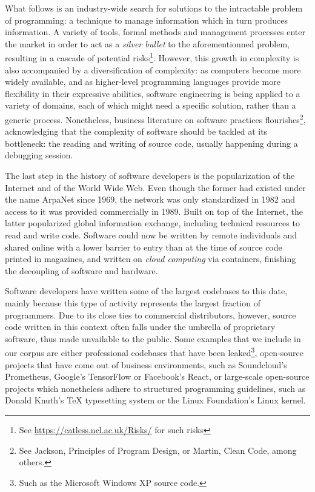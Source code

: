 What follows is an industry-wide search for solutions to the intractable problem of programming: a technique to manage information which in turn produces information. A variety of tools, formal methods and management processes enter the market in order to act as a \emph{silver bullet}\cite{brooks_mythical_1975} to the aforementionned problem, resulting in a cascade of potential risks\footnote{See \url{https://catless.ncl.ac.uk/Risks/} for such risks}. However, this growth in complexity is also accompanied by a diversification of complexity: as computers become more widely available, and as higher-level programming languages provide more flexibility in their expressive abilities, software engineering is being applied to a variety of domains, each of which might need a specific solution, rather than a generic process. Nonetheless, business literature on software practices flourishes\footnote{See Jackson, Principles of Program Design, or Martin, Clean Code, among others.}, acknowledging that the complexity of software should be tackled at its bottleneck: the reading and writing of source code, usually happening during a debugging session.

The last step in the history of software developers is the popularization of the Internet and of the World Wide Web. Even though the former had existed under the name ArpaNet since 1969, the network was only standardized in 1982 and access to it was provided commercially in 1989. Built on top of the Internet, the latter popularized global information exchange, including technical resources to read and write code. Software could now be written by remote individuals and shared online with a lower barrier to entry than at the time of source code printed in magazines, and written on \emph{cloud computing} via containers, finishing the decoupling of software and hardware.

\vspace*{1\baselineskip}

Software developers have written some of the largest codebases to this date, mainly because this type of activity represents the largest fraction of programmers. Due to its close ties to commercial distributors, however, source code written in this context often falls under the umbrella of proprietary software, thus made unvailable to the public. Some examples that we include in our corpus are either professional codebases that have been leaked\footnote{Such as the Microsoft Windows XP source code\cite{warren_windows_2020}.}, open-source projects that have come out of business environments, such as Soundcloud's Prometheus, Google's TensorFlow or Facebook's React, or large-scale open-source projects which nonetheless adhere to structured programming guidelines, such as Donald Knuth's TeX typesetting system or the Linux Foundation's Linux kernel.

